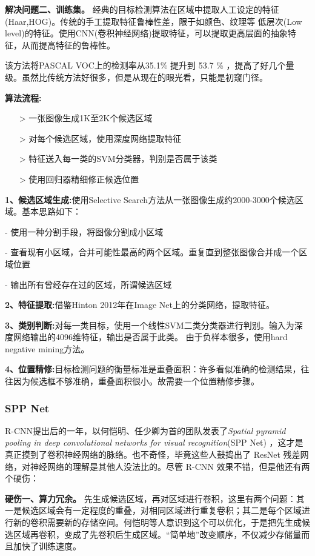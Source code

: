 \textbf{解决问题二、训练集。}
经典的目标检测算法在区域中提取人工设定的特征(Haar,HOG)。传统的手工提取特征鲁棒性差，限于如颜色、纹理等 低层次(Low level)的特征。使用CNN(卷积神经网络)提取特征，可以提取更高层面的抽象特征，从而提高特征的鲁棒性。

该方法将PASCAL VOC上的检测率从35.1\% 提升到 53.7 \% ，提高了好几个量级。虽然比传统方法好很多，但是从现在的眼光看，只能是初窥门径。

\textbf{算法流程:}
\begin{itemize}
	\item[>] 一张图像生成1K至2K个候选区域
	\item[>] 对每个候选区域，使用深度网络提取特征
	\item[>] 特征送入每一类的SVM分类器，判别是否属于该类
	\item[>] 使用回归器精细修正候选位置	
\end{itemize}

\textbf{1、候选区域生成:}使用Selective Search方法从一张图像生成约2000-3000个候选区域。基本思路如下：

- 使用一种分割手段，将图像分割成小区域

- 查看现有小区域，合并可能性最高的两个区域。重复直到整张图像合并成一个区域位置

- 输出所有曾经存在过的区域，所谓候选区域

\textbf{2、特征提取:}借鉴Hinton 2012年在Image Net上的分类网络，提取特征。

\textbf{3、类别判断:}对每一类目标，使用一个线性SVM二类分类器进行判别。输入为深度网络输出的4096维特征，输出是否属于此类。 由于负样本很多，使用hard negative mining方法。

\textbf{4、位置精修:}目标检测问题的衡量标准是重叠面积：许多看似准确的检测结果，往往因为候选框不够准确，重叠面积很小。故需要一个位置精修步骤。 

\subsubsection{SPP Net}
R-CNN提出后的一年，以何恺明、任少卿为首的团队发表了\textit{Spatial pyramid pooling in deep convolutional networks for visual recognition}(SPP Net)\cite{sppnet} ，这才是真正摸到了卷积神经网络的脉络。也不奇怪，毕竟这些人鼓捣出了 ResNet 残差网络，对神经网络的理解是其他人没法比的。尽管 R-CNN 效果不错，但是他还有两个硬伤：

\textbf{硬伤一、算力冗余。}
先生成候选区域，再对区域进行卷积，这里有两个问题：其一是候选区域会有一定程度的重叠，对相同区域进行重复卷积；其二是每个区域进行新的卷积需要新的存储空间。何恺明等人意识到这个可以优化，于是把先生成候选区域再卷积，变成了先卷积后生成区域。“简单地”改变顺序，不仅减少存储量而且加快了训练速度。

